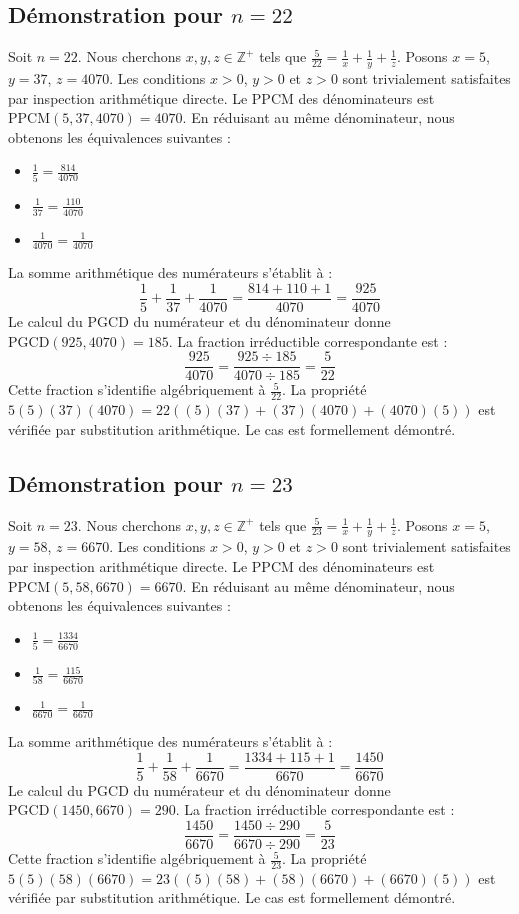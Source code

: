 \documentclass[12pt,a4paper]{article}
\begin{document}
\subsection{Démonstration pour $n = 22$}
Soit $n = 22$. Nous cherchons $x, y, z \in \mathbb{Z}^{+}$ tels que $\frac{5}{22} = \frac{1}{x} + \frac{1}{y} + \frac{1}{z}$.
Posons $x = 5$, $y = 37$, $z = 4070$.
Les conditions $x > 0$, $y > 0$ et $z > 0$ sont trivialement satisfaites par inspection arithmétique directe.
Le PPCM des dénominateurs est $\text{PPCM}(5, 37, 4070) = 4070$.
En réduisant au même dénominateur, nous obtenons les équivalences suivantes :
\begin{itemize}
    \item $\frac{1}{5} = \frac{814}{4070}$
    \item $\frac{1}{37} = \frac{110}{4070}$
    \item $\frac{1}{4070} = \frac{1}{4070}$
\end{itemize}
La somme arithmétique des numérateurs s'établit à :
$$ \frac{1}{5} + \frac{1}{37} + \frac{1}{4070} = \frac{814 + 110 + 1}{4070} = \frac{925}{4070} $$
Le calcul du PGCD du numérateur et du dénominateur donne $\text{PGCD}(925, 4070) = 185$.
La fraction irréductible correspondante est :
$$ \frac{925}{4070} = \frac{925 \div 185}{4070 \div 185} = \frac{5}{22} $$
Cette fraction s'identifie algébriquement à $\frac{5}{22}$.
La propriété $5(5)(37)(4070) = 22((5)(37) + (37)(4070) + (4070)(5))$ est vérifiée par substitution arithmétique.
Le cas est formellement démontré.

\subsection{Démonstration pour $n = 23$}
Soit $n = 23$. Nous cherchons $x, y, z \in \mathbb{Z}^{+}$ tels que $\frac{5}{23} = \frac{1}{x} + \frac{1}{y} + \frac{1}{z}$.
Posons $x = 5$, $y = 58$, $z = 6670$.
Les conditions $x > 0$, $y > 0$ et $z > 0$ sont trivialement satisfaites par inspection arithmétique directe.
Le PPCM des dénominateurs est $\text{PPCM}(5, 58, 6670) = 6670$.
En réduisant au même dénominateur, nous obtenons les équivalences suivantes :
\begin{itemize}
    \item $\frac{1}{5} = \frac{1334}{6670}$
    \item $\frac{1}{58} = \frac{115}{6670}$
    \item $\frac{1}{6670} = \frac{1}{6670}$
\end{itemize}
La somme arithmétique des numérateurs s'établit à :
$$ \frac{1}{5} + \frac{1}{58} + \frac{1}{6670} = \frac{1334 + 115 + 1}{6670} = \frac{1450}{6670} $$
Le calcul du PGCD du numérateur et du dénominateur donne $\text{PGCD}(1450, 6670) = 290$.
La fraction irréductible correspondante est :
$$ \frac{1450}{6670} = \frac{1450 \div 290}{6670 \div 290} = \frac{5}{23} $$
Cette fraction s'identifie algébriquement à $\frac{5}{23}$.
La propriété $5(5)(58)(6670) = 23((5)(58) + (58)(6670) + (6670)(5))$ est vérifiée par substitution arithmétique.
Le cas est formellement démontré.
\end{document}
